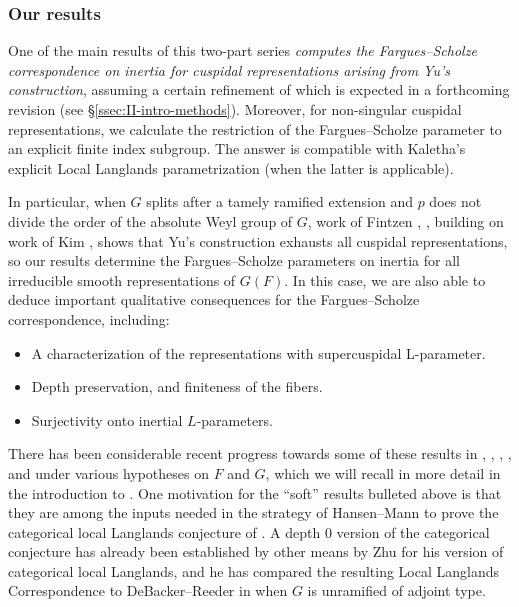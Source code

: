 \documentclass[reqno]{amsart}
\numberwithin{equation}{subsection}
\theoremstyle{remark}
\numberwithin{equation}{subsection}
\numberwithin{figure}{subsection}
\begin{document}
\subsubsection{Our results} 
One of the main results \cite[Theorem~10.1.1]{CF26b} of this two-part series \emph{computes the Fargues--Scholze correspondence on inertia for cuspidal representations arising from Yu's construction}, assuming a certain refinement of \cite{F24} which is expected in a forthcoming revision (see \S \ref{ssec:II-intro-methods}).
Moreover, for non-singular cuspidal representations, we calculate the restriction of the Fargues--Scholze parameter to an explicit finite index subgroup. The answer is compatible with Kaletha's explicit Local Langlands parametrization (when the latter is applicable). 

In particular, when $G$ splits after a tamely ramified extension and $p$ does not divide the order of the absolute Weyl group of $G$, work of Fintzen \cite{Fin21}, \cite{Fin22}, building on work of Kim \cite{Kim07}, shows that Yu's construction \cite{Yu01} exhausts all cuspidal representations, so our results determine the Fargues--Scholze parameters on inertia for all irreducible smooth representations of $G(F)$. In this case, we are also able to deduce important qualitative consequences for the Fargues--Scholze correspondence, including: 
\begin{itemize}
    \item \cite[Theorem~10.1.1(2)]{CF26b} A characterization of the representations with supercuspidal L-parameter.
    \item \cite[Theorem~10.2.1]{CF26b} Depth preservation, and finiteness of the fibers. 
    \item \cite[Theorem~10.3.1]{CF26b} Surjectivity onto inertial $L$-parameters.
\end{itemize}

There has been considerable recent progress towards some of these results in \cite{DL26}, \cite{Ete23}, \cite{Fu26}, \cite{GHS24}, and \cite{BPHT25} under various hypotheses on $F$ and $G$, which we will recall in more detail in the introduction to \cite{CF26b}. One motivation for the ``soft'' results bulleted above is that they are among the inputs needed in the strategy of Hansen--Mann \cite{HM26} to prove the categorical local Langlands conjecture of \cite{FS}. A depth $0$ version of the categorical conjecture has already been established by other means by Zhu \cite{Zhu25} for his version of categorical local Langlands, and he has compared the resulting Local Langlands Correspondence to DeBacker--Reeder in \cite[\S 5.3.4]{Zhu25} when $G$ is unramified of adjoint type.
\end{document}
